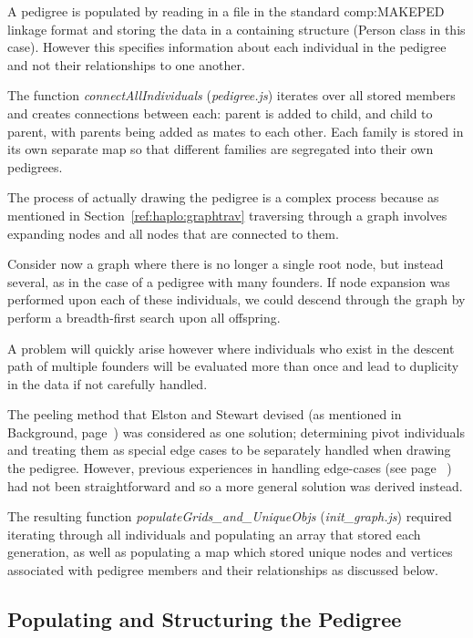 A pedigree is populated by reading in a file in the standard \gls{comp:MAKEPED} linkage format and storing the data in a containing structure (Person class in this case). However this specifies information about each individual in the pedigree and not their relationships to one another.

The function \textit{connectAllIndividuals} (\textit{pedigree.js}) iterates over all stored members and creates connections between each: parent is added to child, and child to parent, with parents being added as mates to each other. Each family is stored in its own separate map so that different families are segregated into their own pedigrees. 

The process of actually drawing the pedigree is a complex process because as mentioned in Section~\ref{ref:haplo:graphtrav} traversing through a graph involves expanding nodes and all nodes that are connected to them.

Consider now a graph where there is no longer a single root node, but instead several, as in the case of a pedigree with many founders. If node expansion was performed upon each of these individuals, we could descend through the graph by perform a breadth-first search upon all offspring. 

A problem will quickly arise however where individuals who exist in the descent path of multiple founders will be evaluated more than once and lead to duplicity in the data if not carefully handled.

The peeling method that Elston and Stewart devised (as mentioned in Background, page~\pageref{ref:back:els})  was considered as one solution; determining pivot individuals and treating them as special edge cases to be separately handled when drawing the pedigree. However, previous experiences in handling edge-cases (see page~\pageref{ref:haplo:eventdiscuss} ) had not been straightforward and so a more general solution was derived instead.

The resulting function \textit{populateGrids\_and\_UniqueObjs} (\textit{init\_graph.js}) required iterating through all individuals and populating an array that stored each generation, as well as populating a map which stored unique nodes and vertices associated with pedigree members and their relationships as discussed below.


\subsection{Populating and Structuring the Pedigree}

